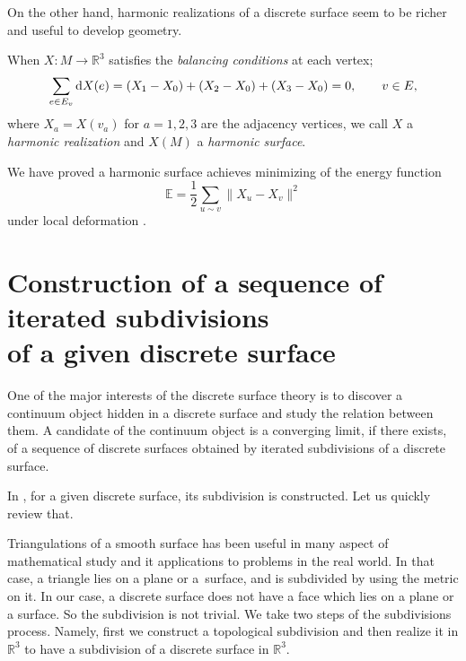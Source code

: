 \documentclass[pdftex]{sigma}
\newcommand{\R}{\mathbb{R}}
\newcommand{\1}{{\bf 1}}
\numberwithin{equation}{section}
\begin{document}
On the other hand, harmonic realizations of a discrete surface seem to be richer and useful to develop geometry.
\begin{Definition}
 When $X\colon M \to \R^3$ satisfies the {\em balancing conditions} at each vertex;
 \begin{equation}
 \label{eq:balancing}
 \sum_{e \in E_v}{\rm d}X(e) = (X_1-X_0) +(X_2-X_0) + (X_3-X_0) =0, \qquad v \in E,
 \end{equation}
 where $X_a = X (v_a)$ for $a=1,2,3$ are the adjacency vertices,
 we call $X$ a {\em harmonic realization} and $X(M)$ a {\em harmonic surface}.
\end{Definition}
We have proved a harmonic surface achieves minimizing of the energy function
\begin{displaymath}
 \mathbb{E} = \frac{1}{2}\sum_{u\sim v} \|X_u-X_v\|^2
\end{displaymath}
under local deformation \cite{kotani-naito-omori}.

\section[Construction of a sequence of iterated subdivisions of a given discrete surface]{Construction of a sequence of iterated subdivisions\\ of a given discrete surface}

One of the major interests of the discrete surface theory is to discover a continuum object hidden
in a discrete surface and study the relation between them.
A candidate of the continuum object is a converging limit,
if there exists, of a sequence of discrete surfaces obtained by iterated subdivisions of a discrete surface.

In \cite{kotani-naito-tao, tao}, for a given discrete surface, its subdivision is constructed.
Let us quickly review that.

Triangulations of a smooth surface has been useful in many aspect of mathematical study and it applications to problems in the real world.
In that case, a triangle lies on a plane or a~surface, and is subdivided by using the metric on it.
In our case, a discrete surface does not have a face which lies on a plane or a surface.
So the subdivision is not trivial.
We take two steps of the subdivisions process.
Namely, first we construct a topological subdivision and then realize it in $\R^3$ to have a subdivision of a discrete surface in $\R^3$.
\end{document}
